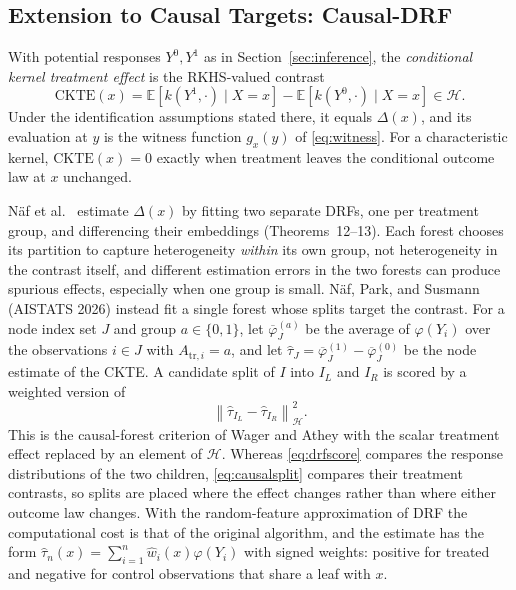 \documentclass[12pt,a4paper]{article}
\newcommand{\E}{\mathbb E}
\newcommand{\calH}{\mathcal H}
\newcommand{\1}{\mathbf 1}
\newcommand{\norm}[1]{\left\lVert#1\right\rVert}
\begin{document}
\subsection{Extension to Causal Targets: Causal-DRF}\label{sec:causal}
With potential responses $Y^0,Y^1$ as in Section~\ref{sec:inference}, the \emph{conditional kernel treatment effect} is the RKHS-valued contrast
\begin{equation}\label{eq:ckte}
 \mathrm{CKTE}(x)=\E[k(Y^1,\cdot)\mid X=x]-\E[k(Y^0,\cdot)\mid X=x]\in\calH .
\end{equation}
Under the identification assumptions stated there, it equals $\Delta(x)$, and its evaluation at $y$ is the witness function $g_x(y)$ of \eqref{eq:witness}. For a characteristic kernel, $\mathrm{CKTE}(x)=0$ exactly when treatment leaves the conditional outcome law at $x$ unchanged.

N\"af et al.\ \cite{naf2023} estimate $\Delta(x)$ by fitting two separate DRFs, one per treatment group, and differencing their embeddings (Theorems~12--13). Each forest chooses its partition to capture heterogeneity \emph{within} its own group, not heterogeneity in the contrast itself, and different estimation errors in the two forests can produce spurious effects, especially when one group is small. N\"af, Park, and Susmann \cite{nafpark2026} (AISTATS 2026) instead fit a single forest whose splits target the contrast. For a node index set $J$ and group $a\in\{0,1\}$, let $\overline\varphi_J^{(a)}$ be the average of $\varphi(Y_i)$ over the observations $i\in J$ with $A_{\mathrm{tr},i}=a$, and let $\widehat\tau_J=\overline\varphi_J^{(1)}-\overline\varphi_J^{(0)}$ be the node estimate of the CKTE. A candidate split of $I$ into $I_L$ and $I_R$ is scored by a weighted version of
\begin{equation}\label{eq:causalsplit}
 \norm{\widehat\tau_{I_L}-\widehat\tau_{I_R}}_{\calH}^2 .
\end{equation}
This is the causal-forest criterion of Wager and Athey \cite{wagerathey2018} with the scalar treatment effect replaced by an element of $\calH$. Whereas \eqref{eq:drfscore} compares the response distributions of the two children, \eqref{eq:causalsplit} compares their treatment contrasts, so splits are placed where the effect changes rather than where either outcome law changes. With the random-feature approximation of DRF the computational cost is that of the original algorithm, and the estimate has the form $\widehat\tau_n(x)=\sum_{i=1}^n\widehat w_i(x)\varphi(Y_i)$ with signed weights: positive for treated and negative for control observations that share a leaf with $x$.
\end{document}
